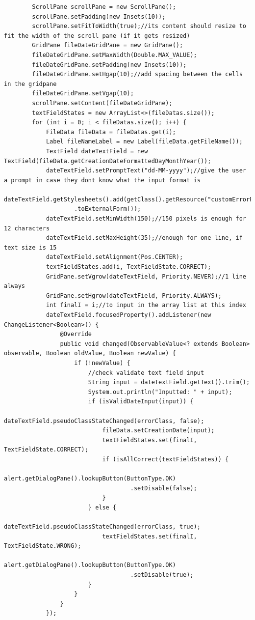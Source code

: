 \begin{lstlisting}
        ScrollPane scrollPane = new ScrollPane();
        scrollPane.setPadding(new Insets(10));
        scrollPane.setFitToWidth(true);//its content should resize to fit the width of the scroll pane (if it gets resized)
        GridPane fileDateGridPane = new GridPane();
        fileDateGridPane.setMaxWidth(Double.MAX_VALUE);
        fileDateGridPane.setPadding(new Insets(10));
        fileDateGridPane.setHgap(10);//add spacing between the cells in the gridpane
        fileDateGridPane.setVgap(10);
        scrollPane.setContent(fileDateGridPane);
        textFieldStates = new ArrayList<>(fileDatas.size());
        for (int i = 0; i < fileDatas.size(); i++) {
            FileData fileData = fileDatas.get(i);
            Label fileNameLabel = new Label(fileData.getFileName());
            TextField dateTextField = new TextField(fileData.getCreationDateFormattedDayMonthYear());
            dateTextField.setPromptText("dd-MM-yyyy");//give the user a prompt in case they dont know what the input format is
            dateTextField.getStylesheets().add(getClass().getResource("customErrorFields.css")
            		.toExternalForm());
            dateTextField.setMinWidth(150);//150 pixels is enough for 12 characters
            dateTextField.setMaxHeight(35);//enough for one line, if text size is 15
            dateTextField.setAlignment(Pos.CENTER);
            textFieldStates.add(i, TextFieldState.CORRECT);
            GridPane.setVgrow(dateTextField, Priority.NEVER);//1 line always
            GridPane.setHgrow(dateTextField, Priority.ALWAYS);
            int finalI = i;//to input in the array list at this index
            dateTextField.focusedProperty().addListener(new ChangeListener<Boolean>() {
                @Override
                public void changed(ObservableValue<? extends Boolean> observable, Boolean oldValue, Boolean newValue) {
                    if (!newValue) {
                        //check validate text field input
                        String input = dateTextField.getText().trim();
                        System.out.println("Inputted: " + input);
                        if (isValidDateInput(input)) {
                            dateTextField.pseudoClassStateChanged(errorClass, false);
                            fileData.setCreationDate(input);
                            textFieldStates.set(finalI, TextFieldState.CORRECT);
                            if (isAllCorrect(textFieldStates)) {
                                alert.getDialogPane().lookupButton(ButtonType.OK)
                                	.setDisable(false);
                            }
                        } else {
                            dateTextField.pseudoClassStateChanged(errorClass, true);
                            textFieldStates.set(finalI, TextFieldState.WRONG);
                            alert.getDialogPane().lookupButton(ButtonType.OK)
                            		.setDisable(true);
                        }
                    }
                }
            });


\end{lstlisting}
